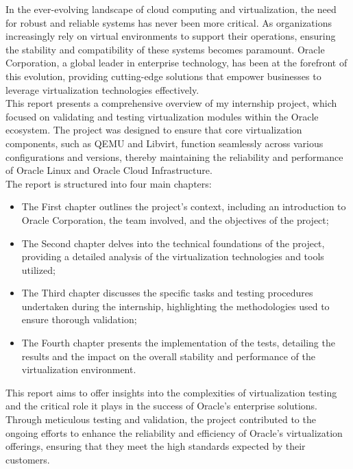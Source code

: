 
In the ever-evolving landscape of cloud computing and virtualization, the need for robust and reliable systems has never been more critical. As organizations increasingly rely on virtual environments to support their operations, ensuring the stability and compatibility of these systems becomes paramount. Oracle Corporation, a global leader in enterprise technology, has been at the forefront of this evolution, providing cutting-edge solutions that empower businesses to leverage virtualization technologies effectively.\\

This report presents a comprehensive overview of my internship project, which focused on validating and testing virtualization modules within the Oracle ecosystem. The project was designed to ensure that core virtualization components, such as QEMU and Libvirt, function seamlessly across various configurations and versions, thereby maintaining the reliability and performance of Oracle Linux and Oracle Cloud Infrastructure.\\

The report is structured into four main chapters:

\begin{itemize}
  \item {The First chapter} outlines the project’s context, including an introduction to Oracle Corporation, the team involved, and the objectives of the project;
  \item {The Second chapter} delves into the technical foundations of the project, providing a detailed analysis of the virtualization technologies and tools utilized;
  \item {The Third chapter} discusses the specific tasks and testing procedures undertaken during the internship, highlighting the methodologies used to ensure thorough validation;
  \item {The Fourth chapter} presents the implementation of the tests, detailing the results and the impact on the overall stability and performance of the virtualization environment.
\end{itemize}

This report aims to offer insights into the complexities of virtualization testing and the critical role it plays in the success of Oracle’s enterprise solutions. Through meticulous testing and validation, the project contributed to the ongoing efforts to enhance the reliability and efficiency of Oracle’s virtualization offerings, ensuring that they meet the high standards expected by their customers.




